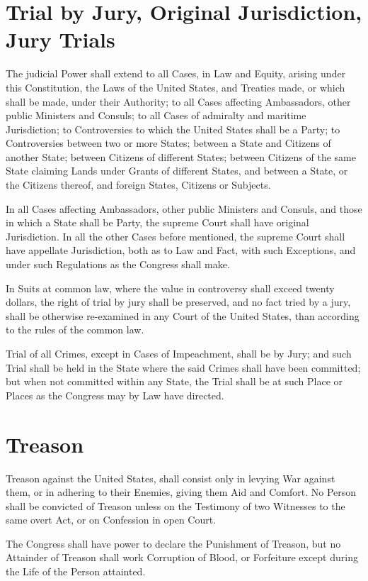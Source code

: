\documentclass{constitution}
\begin{document}
\section{Trial by Jury, Original Jurisdiction, Jury Trials}
The judicial Power shall extend
to all Cases, in Law and Equity, arising under this Constitution,
	the Laws of the United States,
and	Treaties made, or which shall be made, under their Authority;
to all Cases affecting Ambassadors, other public Ministers and Consuls;
to all Cases of admiralty and maritime Jurisdiction;
to Controversies to which the United States shall be a Party;
to Controversies between two or more States;
between a State and Citizens of another State;
between Citizens of different States;
between Citizens of the same State claiming Lands under Grants of different States,
and between a State, or the Citizens thereof, and foreign States, Citizens or Subjects.

In all Cases affecting Ambassadors, other public Ministers and Consuls,
and those in which a State shall be Party,
the supreme Court shall have original Jurisdiction.
In all the other Cases before mentioned,
the supreme Court shall have appellate Jurisdiction, both as to Law and Fact,
with such Exceptions, and under such Regulations as the Congress shall make.

In Suits at common law, where the value in controversy shall exceed twenty dollars,
the right of trial by jury shall be preserved,
and no fact tried by a jury, shall be otherwise re-examined in any Court of the United States,
than according to the rules of the common law.

Trial of all Crimes, except in Cases of Impeachment, shall be by Jury;
and such Trial shall be held in the State where the said Crimes shall have been committed;
but when not committed within any State,
the Trial shall be at such Place or Places as the Congress may by Law have directed.

\section{Treason}
Treason against the United States, shall consist only in levying War against them,
or in adhering to their Enemies, giving them Aid and Comfort.
No Person shall be convicted of Treason
unless on the Testimony of two Witnesses to the same overt Act,
or on Confession in open Court.

The Congress shall have power to declare the Punishment of Treason,
but no Attainder of Treason shall work Corruption of Blood, or Forfeiture
except during the Life of the Person attainted.
\end{document}
